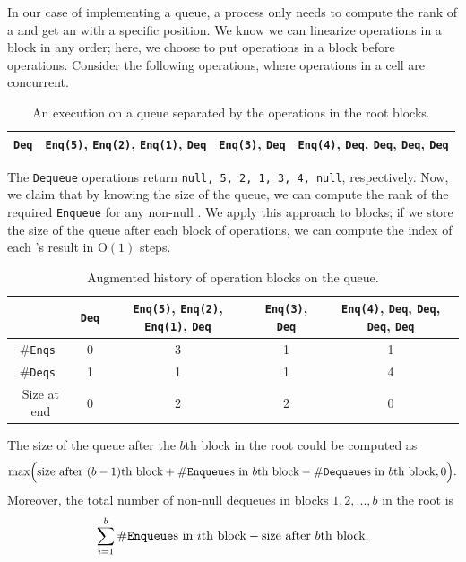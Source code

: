 In our case of implementing a queue, a process only needs to compute
the rank of a  and get an  with a specific
position.  We know we can linearize operations in a block in any
order; here, we choose to put  operations in a block
before  operations. Consider the following operations,
where operations in a cell are concurrent. 
\begin{table}[hbtp]
\centering
\begin{small}
\begin{tabular}{c|c|c|c}
    \hline \texttt{Deq} & \texttt{Enq(5)}, \texttt{Enq(2)}, \texttt{Enq(1)}, \texttt{Deq}& \texttt{Enq(3)}, \texttt{Deq}&  \texttt{Enq(4)}, \texttt{Deq}, \texttt{Deq}, \texttt{Deq}, \texttt{Deq}\\ \hline
  \end{tabular}
\end{small}
\caption{An execution on a queue separated by the operations in the root blocks.}
\end{table}

\noindent The \texttt{Dequeue} operations return \texttt{null, 5, 2,
  1, 3, 4, null}, respectively. 
Now, we claim that by knowing the size of the queue, we can compute
the rank of the required \texttt{Enqueue} for any non-null
. We apply this approach to blocks; if we store the size
of the queue after each block of operations, we can compute the index
of each 's result in \textsc{O}$(1)$ steps. 

\begin{table}[hbtp]
\centering
\begin{small}
  \begin{tabular}{c|c|c|c|c}
    \hline &\texttt{Deq} & \texttt{Enq(5)}, \texttt{Enq(2)}, \texttt{Enq(1)}, \texttt{Deq}& \texttt{Enq(3)}, \texttt{Deq}&  \texttt{Enq(4)}, \texttt{Deq}, \texttt{Deq}, \texttt{Deq}, \texttt{Deq}\\ \hline
    \#\tt{Enq}s & 0 & 3 & 1 & 1 \\ \hline
    \#\tt{Deq}s & 1 & 1 & 1 & 4 \\ \hline
    Size at end & 0 & 2 & 2 & 0 \\ \hline
  \end{tabular}
\end{small}
  \caption{Augmented history of operation blocks on the queue.}
\end{table}

\noindent The size of the queue after the $b$th block in the root
could be computed as 
$$\textrm{max}\Big(\textrm{size after }(b-1)\textrm{th block} +
\#\textrm{\tt{Enqueue}s in }b\textrm{th block} -
\#\textrm{\tt{Dequeue}s in }b\textrm{th block}, 0\Big).$$ 
\noindent Moreover, the total number of non-null dequeues in blocks
$1,2,...,b$ in the root is 
$$ \sum_{i=1}^{b} \#\textrm{\tt{Enqueue}s in }i\textrm{th block} -
\textrm{size after }b\textrm{th block}.$$ 

